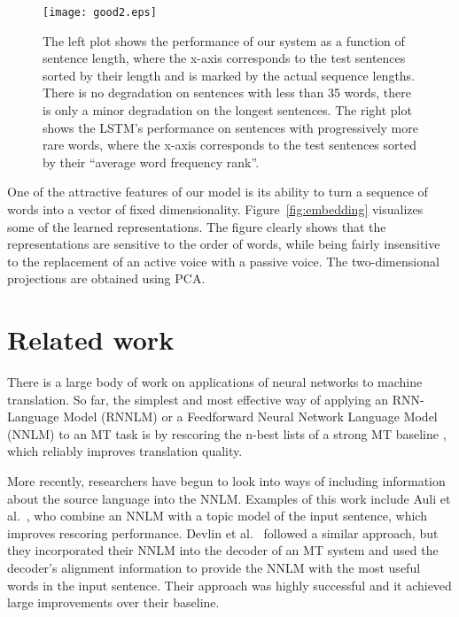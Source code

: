 \documentclass{article} \usepackage{nips14submit_e}
\begin{document}
\begin{figure}[h!]
\centerline{
\texttt{[image: good2.eps]} }  
\caption{\small The left plot shows the performance of our system as a
  function of sentence length, where the x-axis corresponds to the
  test sentences sorted by their length and is marked by the actual
  sequence lengths.  There is no degradation on sentences with less
  than 35 words, there is only a minor degradation on the longest
  sentences.  The right plot shows the LSTM's performance on sentences
  with progressively more rare words, where the x-axis corresponds to
  the test sentences sorted by their ``average word frequency rank''.
}
\label{fig:oriol}
\end{figure}



One of the attractive features of our model is its ability to turn a
sequence of words into a vector of fixed dimensionality.
Figure~\ref{fig:embedding} visualizes some of the learned
representations.  The figure clearly shows that the representations
are sensitive to the order of words, while being fairly insensitive to
the replacement of an active voice with a passive voice.  The
two-dimensional projections are obtained using PCA.






 
\section{Related work}
\label{sec:rel_work}

There is a large body of work on applications of neural networks to
machine translation. So far, the simplest and most effective way of
applying an RNN-Language Model (RNNLM) \cite{mikolov2010recurrent} or
a Feedforward Neural Network Language Model (NNLM) \cite{bengio} to an
MT task is by rescoring the n-best lists of a strong MT baseline
\cite{mikolov2012}, which reliably improves translation quality.

More recently, researchers have begun to look into ways of including
information about the source language into the NNLM.  Examples of this
work include Auli et al.~\cite{auli13}, who combine an NNLM with a
topic model of the input sentence, which improves rescoring
performance.  Devlin et al.~\cite{devlin14} followed a similar
approach, but they incorporated their NNLM into the decoder of an MT
system and used the decoder's alignment information to provide the
NNLM with the most useful words in the input sentence.  Their approach
was highly successful and it achieved large improvements over their
baseline.
\end{document}
